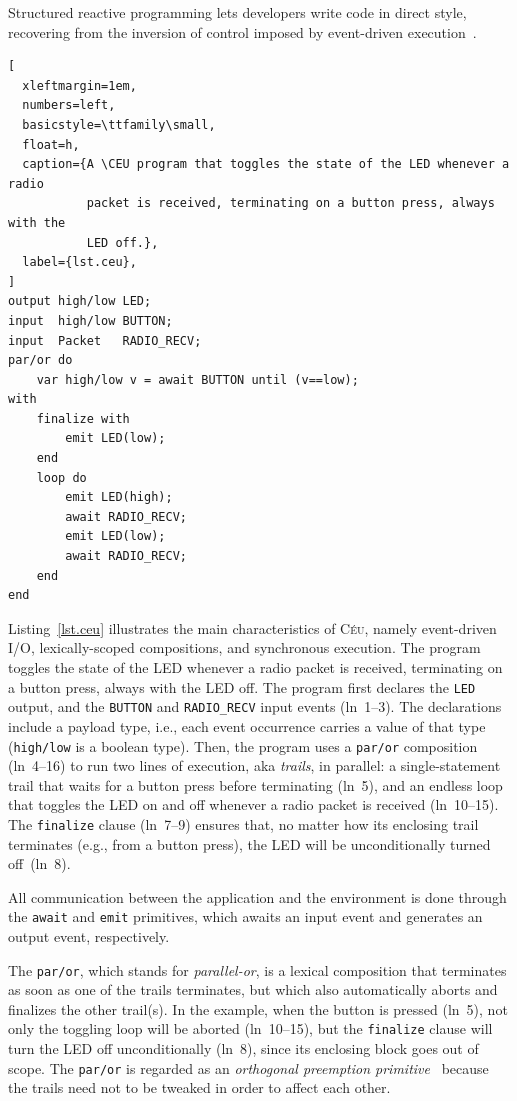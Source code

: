 \documentclass[sigplan,10pt,review,anonymous]{acmart}\settopmatter{printfolios=true,printccs=false,printacmref=false}
\newcommand{\CEU}{\textsc{C\'{e}u}\xspace}
\newcommand{\code}[1] {{\small{\texttt{#1}}}}
\begin{document}
Structured reactive programming lets developers write code in direct style,
recovering from the inversion of control imposed by event-driven
execution~\cite{rp.deprecating}. %

\begin{lstlisting}[
  xleftmargin=1em,
  numbers=left,
  basicstyle=\ttfamily\small,
  float=h,
  caption={A \CEU program that toggles the state of the LED whenever a radio
           packet is received, terminating on a button press, always with the
           LED off.},
  label={lst.ceu},
]
output high/low LED;
input  high/low BUTTON;
input  Packet   RADIO_RECV;
par/or do
    var high/low v = await BUTTON until (v==low);
with
    finalize with
        emit LED(low);
    end
    loop do
        emit LED(high);
        await RADIO_RECV;
        emit LED(low);
        await RADIO_RECV;
    end
end
\end{lstlisting}

Listing~\ref{lst.ceu} illustrates the main characteristics of \CEU, namely
event-driven I/O, lexically-scoped compositions, and synchronous execution.
%
The program toggles the state of the LED whenever a radio packet is received,
terminating on a button press, always with the LED off.
%
The program first declares the \code{LED} output, and the \code{BUTTON} and
\code{RADIO\_RECV} input events (ln~1--3).
The declarations include a payload type, i.e., each event occurrence carries
a value of that type (\code{high/low} is a boolean type).
%
Then, the program uses a \code{par/or} composition (ln~4--16) to run two lines
of execution, aka \emph{trails}, in parallel:
a single-statement trail that waits for a button press before terminating
(ln~5), and an endless loop that toggles the LED on and off whenever a radio
packet is received (ln~10--15).
The \code{finalize} clause (ln~7--9) ensures that, no matter how its enclosing
trail terminates (e.g., from a button press), the LED will be unconditionally
turned off~(ln~8).

All communication between the application and the environment is done through
the \code{await} and \code{emit} primitives, which awaits an input event and
generates an output event, respectively.

The \code{par/or}, which stands for \emph{parallel-or}, is a lexical
composition that terminates as soon as one of the trails terminates, but which
also automatically aborts and finalizes the other trail(s).
%
In the example, when the button is pressed (ln~5), not only the toggling loop
will be aborted (ln~10--15), but the \code{finalize} clause will turn the LED
off unconditionally (ln~8), since its enclosing block goes out of scope.
%
The \code{par/or} is regarded as an \emph{orthogonal preemption
primitive}~\cite{esterel.preemption} because the trails need not to be tweaked
in order to affect each other.
\end{document}
